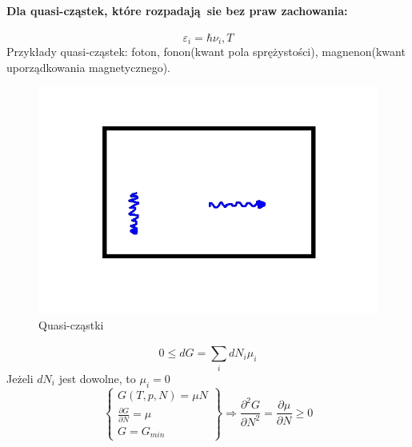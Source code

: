 \documentclass{article}
\begin{document}
		\paragraph{Dla quasi-cząstek, które rozpadają sie bez praw zachowania:}
		\begin{equation}
		\varepsilon_i = \hbar \nu _i, T
		\end{equation}
		Przykłady quasi-cząstek: foton, fonon(kwant pola sprężystości), magnenon(kwant uporządkowania magnetycznego).
		\begin{figure}[ht]
			\label{fig:fig1}
			\centering
			\includegraphics[scale=0.6]{quasiczastki.jpeg}
			\caption{Quasi-cząstki}
		\end{figure}
		\begin{equation}
		0 \leqslant dG = \sum_{i}^{}dN_i\mu_i
		\end{equation}
		Jeżeli $ dN_i $ jest dowolne, to $ \mu_i = 0 $
		\begin{equation}
		\begin{Bmatrix}
			G(T, p, N) = \mu N \\
			\frac{\partial G}{\partial N} = \mu \\
			G = G_{min}
		\end{Bmatrix}
		\Rightarrow \frac{\partial^2 G}{\partial N^2} = 
		\frac{\partial \mu}{\partial N} \geqslant 0
		\end{equation}
\end{document}
